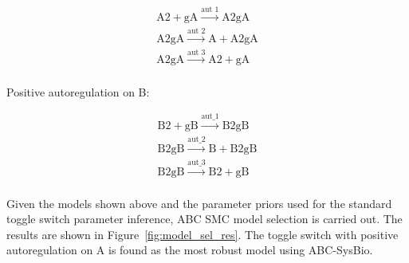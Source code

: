 $$
\begin{array}{cccc} 
    \textrm{A2} + \textrm{gA} \stackrel{\textrm{aut 1}}{\longrightarrow} \textrm{A2gA} \\
    \textrm{A2gA} \stackrel{\textrm{aut 2}}{\longrightarrow} \textrm{A} + \textrm{A2gA}\\
    \textrm{A2gA} \stackrel{\textrm{aut 3}}{\longrightarrow} \textrm{A2}+ \textrm{gA}  \\
\end{array}
$$

Positive autoregulation on B:

$$
\begin{array}{cccc} 
    \textrm{B2} + \textrm{gB} \stackrel{\textrm{aut\_1}}{\longrightarrow} \textrm{B2gB} \\
    \textrm{B2gB} \stackrel{\textrm{aut\_2}}{\longrightarrow} \textrm{B} + \textrm{B2gB}\\
    \textrm{B2gB} \stackrel{\textrm{aut\_3}}{\longrightarrow} \textrm{B2}+ \textrm{gB}  \\
\end{array}
$$

%
%
%

Given the models shown above and the parameter priors used for the standard toggle switch parameter inference, ABC SMC model selection is carried out. The results are shown in Figure~\ref{fig:model_sel_res}. The toggle switch with positive autoregulation on A is found as the most robust model using ABC-SysBio. 



